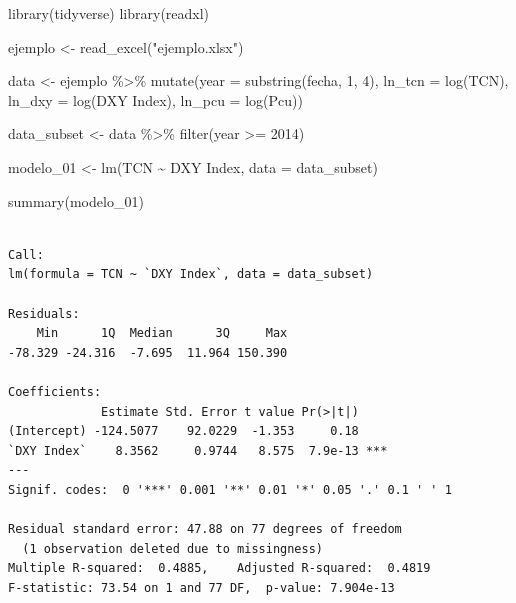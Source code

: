 \documentclass[
  letterpaper,
  DIV=11,
  numbers=noendperiod]{scrartcl}
\newenvironment{Shaded}{\begin{snugshade}}{\end{snugshade}}
\newcommand{\AttributeTok}[1]{\textcolor[rgb]{0.40,0.45,0.13}{#1}}
\newcommand{\DecValTok}[1]{\textcolor[rgb]{0.68,0.00,0.00}{#1}}
\newcommand{\FunctionTok}[1]{\textcolor[rgb]{0.28,0.35,0.67}{#1}}
\newcommand{\NormalTok}[1]{\textcolor[rgb]{0.00,0.23,0.31}{#1}}
\newcommand{\OtherTok}[1]{\textcolor[rgb]{0.00,0.23,0.31}{#1}}
\newcommand{\SpecialCharTok}[1]{\textcolor[rgb]{0.37,0.37,0.37}{#1}}
\newcommand{\StringTok}[1]{\textcolor[rgb]{0.13,0.47,0.30}{#1}}
\begin{document}
\begin{Shaded}
\begin{Highlighting}[]
\FunctionTok{library}\NormalTok{(tidyverse)}
\FunctionTok{library}\NormalTok{(readxl)}

\NormalTok{ejemplo }\OtherTok{\textless{}{-}} \FunctionTok{read\_excel}\NormalTok{(}\StringTok{"ejemplo.xlsx"}\NormalTok{)}

\NormalTok{data }\OtherTok{\textless{}{-}}\NormalTok{ ejemplo }\SpecialCharTok{\%\textgreater{}\%} 
  \FunctionTok{mutate}\NormalTok{(}\AttributeTok{year =} \FunctionTok{substring}\NormalTok{(fecha, }\DecValTok{1}\NormalTok{, }\DecValTok{4}\NormalTok{),}
         \AttributeTok{ln\_tcn =} \FunctionTok{log}\NormalTok{(TCN),}
         \AttributeTok{ln\_dxy =} \FunctionTok{log}\NormalTok{(}\StringTok{\textasciigrave{}}\AttributeTok{DXY Index}\StringTok{\textasciigrave{}}\NormalTok{),}
         \AttributeTok{ln\_pcu =} \FunctionTok{log}\NormalTok{(Pcu))}

\NormalTok{data\_subset }\OtherTok{\textless{}{-}}\NormalTok{ data }\SpecialCharTok{\%\textgreater{}\%} 
  \FunctionTok{filter}\NormalTok{(year }\SpecialCharTok{\textgreater{}=} \DecValTok{2014}\NormalTok{)}

\NormalTok{modelo\_01 }\OtherTok{\textless{}{-}} \FunctionTok{lm}\NormalTok{(TCN }\SpecialCharTok{\textasciitilde{}} \StringTok{\textasciigrave{}}\AttributeTok{DXY Index}\StringTok{\textasciigrave{}}\NormalTok{, }\AttributeTok{data =}\NormalTok{ data\_subset)}

\FunctionTok{summary}\NormalTok{(modelo\_01)}
\end{Highlighting}
\end{Shaded}

\begin{verbatim}

Call:
lm(formula = TCN ~ `DXY Index`, data = data_subset)

Residuals:
    Min      1Q  Median      3Q     Max 
-78.329 -24.316  -7.695  11.964 150.390 

Coefficients:
             Estimate Std. Error t value Pr(>|t|)    
(Intercept) -124.5077    92.0229  -1.353     0.18    
`DXY Index`    8.3562     0.9744   8.575  7.9e-13 ***
---
Signif. codes:  0 '***' 0.001 '**' 0.01 '*' 0.05 '.' 0.1 ' ' 1

Residual standard error: 47.88 on 77 degrees of freedom
  (1 observation deleted due to missingness)
Multiple R-squared:  0.4885,    Adjusted R-squared:  0.4819 
F-statistic: 73.54 on 1 and 77 DF,  p-value: 7.904e-13
\end{verbatim}
\end{document}
